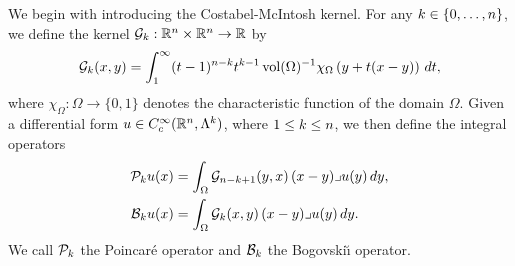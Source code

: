 \documentclass[10pt,letterpaper]{article}
\begin{document}
We begin with introducing the Costabel-McIntosh kernel.
For any $k \in \{0,\dotsc,n\}$, we define the kernel ${\mathcal G}_{k} : {\mathbb R}^{n} \times {\mathbb R}^{n} \rightarrow {\mathbb R}$ by
\begin{equation}\label{math:mainkernel}
  {\mathcal G}_{k}(x,y) = \int_{1}^\infty (t-1)^{n-k}t^{k-1} \operatorname{vol}(\Omega)^{-1}\chi_{\Omega} \left(y+t(x-y)\right)\,dt
  ,
\end{equation}
where $\chi_{\Omega} : \Omega \rightarrow \{0,1\}$ denotes the characteristic function of the domain $\Omega$.
Given a differential form $u \in {C^\infty_c}({\mathbb R}^n,\Lambda^k)$, where \(1 \leq k \leq n\), 
we then define the integral operators
\begin{align*}
  {\mathcal P}_{k} u(x) &= \int_{\Omega} {\mathcal G}_{n-k+1}(y,x) \,(x-y)\lrcorner u(y)\,dy,
  \\
  {\mathcal B}_{k} u(x) &= \int_{\Omega} {\mathcal G}_{k}(x,y) \,(x-y)\lrcorner u(y)\,dy.
\end{align*}
We call ${\mathcal P}_{k}$ the Poincar\'e operator and ${\mathcal B}_{k}$ the Bogovski\u{\i} operator. 
\end{document}
